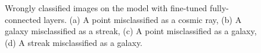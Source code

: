 \begin{figure}[!h]
    \caption[Wrongly classified images on the model with fine-tuned fully-connected layers.]
    {Wrongly classified images on the model with fine-tuned fully-connected layers. (a) A point misclassified as a cosmic ray, (b) A galaxy misclassified as a streak, (c) A point misclassified as a galaxy, (d) A streak misclassified as a galaxy. }
    \label{fig:wrongfc}
\end{figure}
